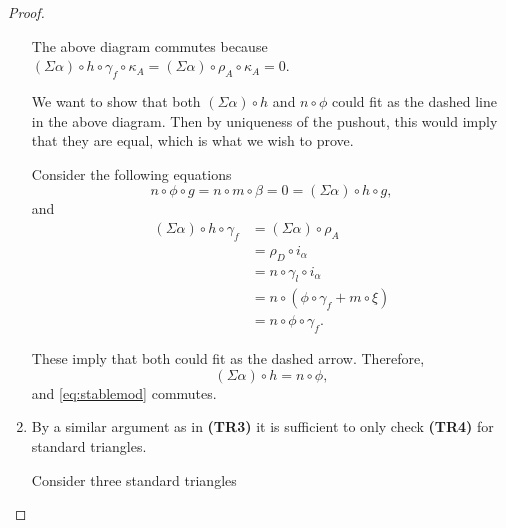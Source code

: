 \begin{proof}
\begin{enumerate}[label={(\bfseries TR\arabic*)}]
{\begin{center}
            \end{center}
            The above diagram commutes because \( (\Sigma \alpha) \circ h \circ \gamma_f \circ \kappa_A = (\Sigma \alpha) \circ \rho_A \circ \kappa_A = 0 \).

            We want to show that both \( (\Sigma \alpha) \circ h \) and \( n \circ \phi \) could fit as the dashed line in the above diagram. Then by uniqueness of the pushout, this would imply that they are equal, which is what we wish to prove.

            Consider the following equations
            \[
                n \circ \phi \circ g = n \circ m \circ \beta = 0 = (\Sigma \alpha) \circ h \circ g,
            \]
            and
            \begin{align*}
                (\Sigma \alpha) \circ h \circ \gamma_f &= (\Sigma \alpha) \circ \rho_A \\
                &= \rho_{D} \circ i_{\alpha} \\
                &= n \circ \gamma_{l} \circ i_{\alpha} \\
                &= n \circ (\phi \circ \gamma_f + m \circ \xi) \\
                &= n \circ \phi \circ \gamma_f.
            \end{align*}

            These imply that both could fit as the dashed arrow. Therefore,
            \[
                (\Sigma \alpha) \circ h = n \circ \phi,
            \]
            and \autoref{eq:stablemod} commutes.
        }
        \item {
            By a similar argument as in {\bf (TR3)} it is sufficient to only check {\bf (TR4)} for standard triangles.

            Consider three standard triangles
            \begin{center}
\end{center}}
\end{enumerate}
\end{proof}
